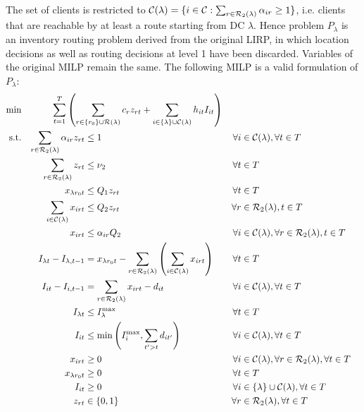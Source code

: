 \documentclass[a4paper,10pt]{article}
\begin{document}
\begin{linenumbers}
The set of clients is restricted to $\mathcal{C}(\lambda) =\{i\in\mathcal{C}: \sum_{r\in\mathcal{R}_2(\lambda)} \alpha_{ir}\geq 1 \}$, i.e. clients that are reachable by at least a route starting from DC $\lambda$. 
Hence problem $P_{\lambda}$ is an inventory routing problem derived from the original LIRP, in which location decisions as well as routing decisions at level 1 have been discarded. 
Variables of the original MILP remain the same. 
The following MILP is a valid formulation of $P_{\lambda}$:
%
\begin{alignat}{3}
\text{min} &&\sum_{t=1}^{T} \left( \sum_{r\in \{r_0\} \cup \ro(\lambda)} c_r z_{rt} + \sum_{i\in \left\{\lambda\right\}\cup \cu(\lambda)} h_{it} I_{it}\right) \span\omit\label{decomp_objfunct}\\ 
\text{s.t.}  %
&&\sum_{r\in \ro_2(\lambda)} \alpha_{ir} z_{rt} &\leq 1 															&\forall i&\in \cu(\lambda), \forall t\in T  \label{const:decomp_singleroutecustomers}\\
&&\sum_{r\in \ro_2(\lambda)} z_{rt} &\leq 	\nu_2		&\forall t&\in T  \label{const:decomp_fleetcapa}\\
&&x_{\lambda r_0 t}   		&\leq Q_1 z_{rt} 		&\forall t&\in T\label{const:decomp_deliveryDCUB}\\
&&\sum_{i\in \cu(\lambda)} x_{irt}   		&\leq Q_2 z_{rt} 														&\forall r&\in \ro_2(\lambda), t\in T\label{const:decomp_deliveryUB}\\
&&x_{irt}   		&\leq \alpha_{ir} Q_2  			&\forall i&\in\cu(\lambda), \forall r\in \ro_2(\lambda), t\in T\label{const:decomp_deliveryConstLoc}\\
&&I_{\lambda t}- I_{\lambda,t-1} &=     x_{\lambda r_0 t}   - \sum_{r\in \ro_2(\lambda)}\left( \sum_{i\in \cu(\lambda)}x_{irt}\right)\quad 			&\forall t& \in T \label{const:decomp_invflowdepots}\\
&&I_{it} - I_{i,t-1} &= \sum_{r\in \ro_2(\lambda)} x_{irt} - d_{it} 			&\forall i&\in \cu(\lambda), \forall t\in T\label{const:decomp_dinvflowcustomers}\\
&&I_{\lambda t}	&\leq I_\lambda^{\max}  			& \forall t&\in T\label{const:decomp_invdepotUB}\\	
&&I_{it} 		& \leq \min\left(I_i^{\max}, \sum_{t' > t}d_{it'}\right)											&\forall i&\in \cu(\lambda), \forall t\in T\label{const:decomp_invcustUB}\\
&&x_{irt}			&\geq 0 							&\forall i&\in \cu(\lambda), \forall r\in \ro_2(\lambda),\forall t \in T\label{const:decomp_qpos}	\\
&&x_{\lambda r_0 t}			&\geq 0 				&\forall t&\in T\label{const:decomp_qdcpos}	\\
&&I_{it}	&\geq 0 			&\forall i &\in \{\lambda\}\cup \cu(\lambda), \forall t\in T\label{const:decomp_invCpos}	\\
&&z_{rt}		&\in \{0,1\} 	&\forall r&\in \ro_2(\lambda), \forall t\in T\label{const:decomp_zbool}
\end{alignat}



\end{linenumbers}
\end{document}
